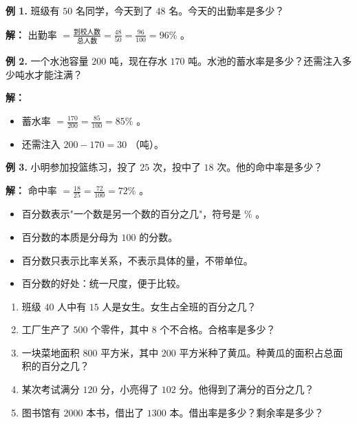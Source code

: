 \begin{workedexamples}


\textbf{例 1.} 班级有 $50$ 名同学，今天到了 $48$ 名。今天的出勤率是多少？

\textbf{解：} 出勤率 $= \frac{\text{到校人数}}{\text{总人数}} = \frac{48}{50} = \frac{96}{100} = 96\%$ 。

\textbf{例 2.} 一个水池容量 $200$ 吨，现在存水 $170$ 吨。水池的蓄水率是多少？还需注入多少吨水才能注满？

\textbf{解：}
\begin{itemize}
  \item 蓄水率 $= \frac{170}{200} = \frac{85}{100} = 85\%$ 。
  \item 还需注入 $200 - 170 = 30$ （吨）。
\end{itemize}


\textbf{例 3.} 小明参加投篮练习，投了 $25$ 次，投中了 $18$ 次。他的命中率是多少？

\textbf{解：} 命中率 $= \frac{18}{25} = \frac{72}{100} = 72\%$ 。

\end{workedexamples}

\begin{keytakeaway}


\begin{itemize}
  \item 百分数表示"一个数是另一个数的百分之几"，符号是 $\%$ 。
  \item 百分数的本质是分母为 $100$ 的分数。
  \item 百分数只表示比率关系，不表示具体的量，不带单位。
  \item 百分数的好处：统一尺度，便于比较。
\end{itemize}


\end{keytakeaway}

\begin{practice}


\begin{enumerate}
  \item 班级 $40$ 人中有 $15$ 人是女生。女生占全班的百分之几？
  \item 工厂生产了 $500$ 个零件，其中 $8$ 个不合格。合格率是多少？
  \item 一块菜地面积 $800$ 平方米，其中 $200$ 平方米种了黄瓜。种黄瓜的面积占总面积的百分之几？
  \item 某次考试满分 $120$ 分，小亮得了 $102$ 分。他得到了满分的百分之几？
  \item 图书馆有 $2000$ 本书，借出了 $1300$ 本。借出率是多少？剩余率是多少？
\end{enumerate}


\end{practice}

